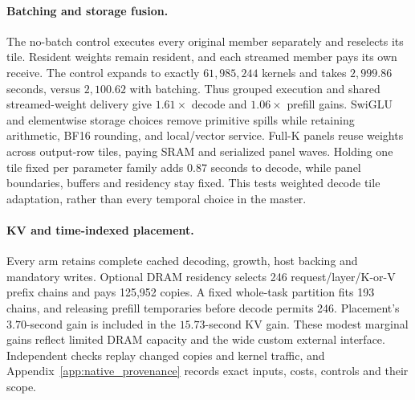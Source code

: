 \paragraph{Batching and storage fusion.}
The no-batch control executes every original member separately and reselects its tile.
Resident weights remain resident, and each streamed member pays its own receive.
The control expands to exactly $61{,}985{,}244$ kernels and takes $2{,}999.86$ seconds, versus $2{,}100.62$ with batching.
Thus grouped execution and shared streamed-weight delivery give $1.61\times$ decode and $1.06\times$ prefill gains.
SwiGLU and elementwise storage choices remove primitive spills while retaining arithmetic, BF16 rounding, and local/vector service.
Full-K panels reuse weights across output-row tiles, paying SRAM and serialized panel waves.
Holding one tile fixed per parameter family adds $0.87$ seconds to decode, while panel boundaries, buffers and residency stay fixed.
This tests weighted decode tile adaptation, rather than every temporal choice in the master.

\paragraph{KV and time-indexed placement.}
Every arm retains complete cached decoding, growth, host backing and mandatory writes.
Optional DRAM residency selects 246 request/layer/K-or-V prefix chains and pays 125,952 copies.
A fixed whole-task partition fits 193 chains, and releasing prefill temporaries before decode permits 246.
Placement's $3.70$-second gain is included in the $15.73$-second KV gain.
These modest marginal gains reflect limited DRAM capacity and the wide custom external interface.
Independent checks replay changed copies and kernel traffic, and Appendix~\ref{app:native_provenance} records exact inputs, costs, controls and their scope.
